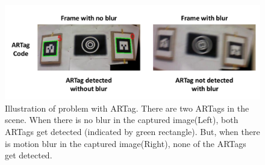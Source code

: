 \begin{itemize}
\begin{figure}[h!]
\centering
\includegraphics[width=0.98\linewidth]{figures/fiducial/ARTagBlur}
\caption[Problem of motion blur in ARTag]{Illustration of problem with ARTag.
There are two ARTags in the scene.
When there is no blur in the captured image(Left), both ARTags get detected
(indicated by green rectangle). But, when there is motion blur in the captured
image(Right), none of the ARTags get detected.}
\label{fig:ARTagBlur}
\end{figure}

\end{itemize}


